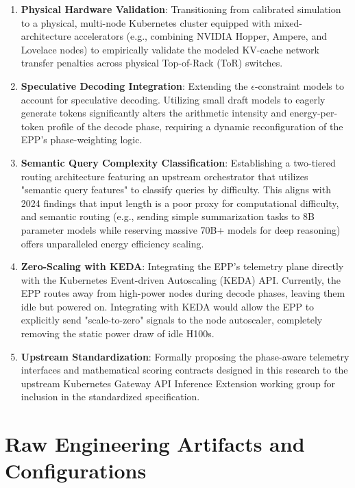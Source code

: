 \documentclass[12pt,a4paper,oneside]{report}
\begin{document}
\begin{enumerate}
    \item \textbf{Physical Hardware Validation}: Transitioning from calibrated simulation to a physical, multi-node Kubernetes cluster equipped with mixed-architecture accelerators (e.g., combining NVIDIA Hopper, Ampere, and Lovelace nodes) to empirically validate the modeled KV-cache network transfer penalties across physical Top-of-Rack (ToR) switches.
    
    \item \textbf{Speculative Decoding Integration}: Extending the \(\epsilon\)-constraint models to account for speculative decoding. Utilizing small draft models to eagerly generate tokens significantly alters the arithmetic intensity and energy-per-token profile of the decode phase, requiring a dynamic reconfiguration of the EPP's phase-weighting logic.
    
    \item \textbf{Semantic Query Complexity Classification}: Establishing a two-tiered routing architecture featuring an upstream orchestrator that utilizes "semantic query features" to classify queries by difficulty. This aligns with 2024 findings that input length is a poor proxy for computational difficulty, and semantic routing (e.g., sending simple summarization tasks to 8B parameter models while reserving massive 70B+ models for deep reasoning) offers unparalleled energy efficiency scaling.
    
    \item \textbf{Zero-Scaling with KEDA}: Integrating the EPP's telemetry plane directly with the Kubernetes Event-driven Autoscaling (KEDA) API. Currently, the EPP routes away from high-power nodes during decode phases, leaving them idle but powered on. Integrating with KEDA would allow the EPP to explicitly send "scale-to-zero" signals to the node autoscaler, completely removing the static power draw of idle H100s.
    
    \item \textbf{Upstream Standardization}: Formally proposing the phase-aware telemetry interfaces and mathematical scoring contracts designed in this research to the upstream Kubernetes Gateway API Inference Extension working group for inclusion in the standardized specification.
\end{enumerate}



\appendix
\chapter{Raw Engineering Artifacts and Configurations}
\end{document}
